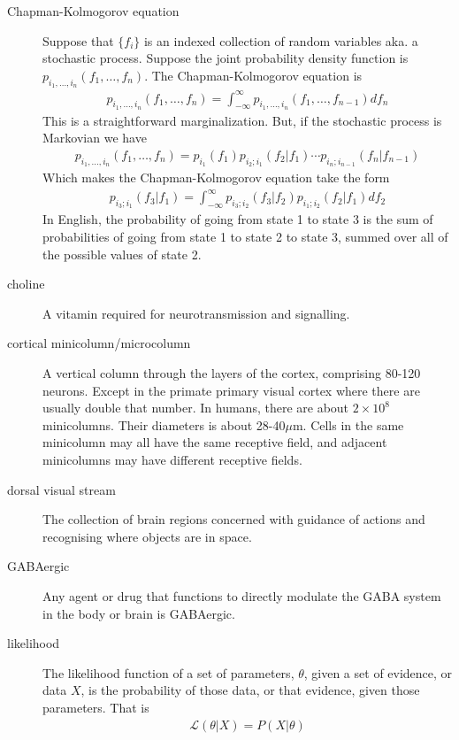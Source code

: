 \documentclass[a4paper,12pt]{article}
\theoremstyle{definition}
\begin{document}
\begin{description}
  \item[Chapman-Kolmogorov equation] Suppose that $\lbrace f_i \rbrace$  is an indexed collection of random variables aka. a stochastic process. Suppose the joint probability density function is  $p_{i_1, \dots, i_n}(f_1, \dots, f_n)$. The Chapman-Kolmogorov equation is
    \begin{align}
    p_{i_1, \dots, i_n}(f_1, \dots, f_n) = \int_{-\infty}^{\infty} p_{i_1, \dots, i_n}(f_1, \dots, f_{n-1}) df_n
    \end{align}
  This is a straightforward marginalization. But, if the stochastic process is Markovian we have
    \begin{align}
    p_{i_1, \dots, i_n}(f_1, \dots, f_n) = p_{i_1}(f_1)p_{i_2;i_1}(f_2|f_1) \cdots p_{i_n;i_{n-1}}(f_n|f_{n-1})
    \end{align}
  Which makes the Chapman-Kolmogorov equation take the form
    \begin{align}
    p_{i_3;i_1}(f_3|f_1) = \int_{-\infty}^{\infty} p_{i_3;i_2}(f_3|f_2) p_{i_1;i_2}(f_2|f_1) df_2
    \end{align}
  In English, the probability of going from state 1 to state 3 is the sum of probabilities of going from state 1 to state 2 to state 3, summed over all of the possible values of state 2.

  \item[choline] A vitamin required for neurotransmission and signalling.

  \item[cortical minicolumn/microcolumn] A vertical column through the layers of the cortex, comprising 80-120 neurons. Except in the primate primary visual cortex where there are usually double that number. In humans, there are about $2\times 10^8$ minicolumns. Their diameters is about 28-40$\mu$m. Cells in the same minicolumn may all have the same receptive field, and adjacent minicolumns may have different receptive fields.

  \item[dorsal visual stream] The collection of brain regions concerned with guidance of actions and recognising where objects are in space.

  \item[GABAergic] Any agent or drug that functions to directly modulate the GABA system in the body or brain is GABAergic.

  \item[likelihood] The likelihood function of a set of parameters, $\theta$, given a set of evidence, or data $X$, is the probability of those data, or that evidence, given those parameters. That is
  \begin{align}
   \mathcal{L}(\theta | X) = P(X | \theta)
  \end{align}


\end{description}
\end{document}
